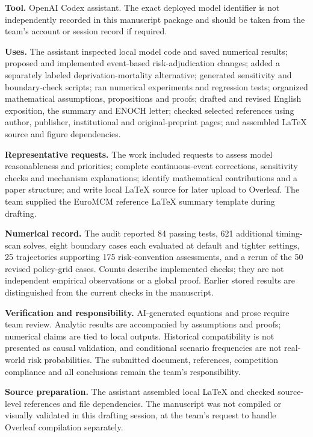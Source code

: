 \documentclass[12pt,a4paper]{article}
\theoremstyle{remark}
\begin{document}
\textbf{Tool.} OpenAI Codex assistant. The exact deployed model identifier is not independently recorded in this manuscript package and should be taken from the team's account or session record if required.

\textbf{Uses.} The assistant inspected local model code and saved numerical results; proposed and implemented event-based risk-adjudication changes; added a separately labeled deprivation-mortality alternative; generated sensitivity and boundary-check scripts; ran numerical experiments and regression tests; organized mathematical assumptions, propositions and proofs; drafted and revised English exposition, the summary and ENOCH letter; checked selected references using author, publisher, institutional and original-preprint pages; and assembled LaTeX source and figure dependencies.

\textbf{Representative requests.} The work included requests to assess model reasonableness and priorities; complete continuous-event corrections, sensitivity checks and mechanism explanations; identify mathematical contributions and a paper structure; and write local LaTeX source for later upload to Overleaf. The team supplied the EuroMCM reference LaTeX summary template during drafting.

\textbf{Numerical record.} The audit reported 84 passing tests, 621 additional timing-scan solves, eight boundary cases each evaluated at default and tighter settings, 25 trajectories supporting 175 risk-convention assessments, and a rerun of the 50 revised policy-grid cases. Counts describe implemented checks; they are not independent empirical observations or a global proof. Earlier stored results are distinguished from the current checks in the manuscript.

\textbf{Verification and responsibility.} AI-generated equations and prose require team review. Analytic results are accompanied by assumptions and proofs; numerical claims are tied to local outputs. Historical compatibility is not presented as causal validation, and conditional scenario frequencies are not real-world risk probabilities. The submitted document, references, competition compliance and all conclusions remain the team's responsibility.

\textbf{Source preparation.} The assistant assembled local LaTeX and checked source-level references and file dependencies. The manuscript was not compiled or visually validated in this drafting session, at the team's request to handle Overleaf compilation separately.
\end{document}
